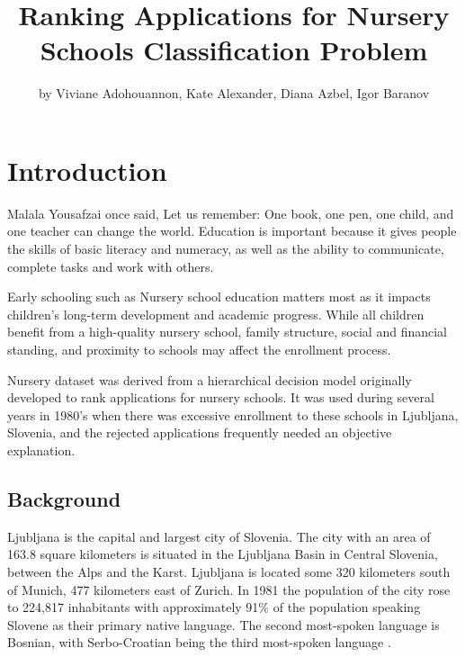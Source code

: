 \title{Ranking Applications for Nursery Schools Classification Problem}
\author{by Viviane Adohouannon, Kate Alexander, Diana Azbel, Igor Baranov}

\maketitle



\hypertarget{introduction}{%
\section{Introduction}\label{introduction}}

Malala Yousafzai once said, Let us remember: One book, one pen, one
child, and one teacher can change the world. Education is important
because it gives people the skills of basic literacy and numeracy, as
well as the ability to communicate, complete tasks and work with others.

Early schooling such as Nursery school education matters most as it
impacts children's long-term development and academic progress. While
all children benefit from a high-quality nursery school, family
structure, social and financial standing, and proximity to schools may
affect the enrollment process.

Nursery dataset \citep{noauthor_uci_nodate} was derived from a
hierarchical decision model originally developed to rank applications
for nursery schools. It was used during several years in 1980's when
there was excessive enrollment to these schools in Ljubljana, Slovenia,
and the rejected applications frequently needed an objective
explanation.

\hypertarget{background}{%
\subsection{Background}\label{background}}

Ljubljana is the capital and largest city of Slovenia. The city with an
area of 163.8 square kilometers is situated in the Ljubljana Basin in
Central Slovenia, between the Alps and the Karst. Ljubljana is located
some 320 kilometers south of Munich, 477 kilometers east of Zurich. In
1981 the population of the city rose to 224,817 inhabitants with
approximately 91\% of the population speaking Slovene as their primary
native language. The second most-spoken language is Bosnian, with
Serbo-Croatian being the third most-spoken language
\citep{noauthor_ljubljana_2018}.

